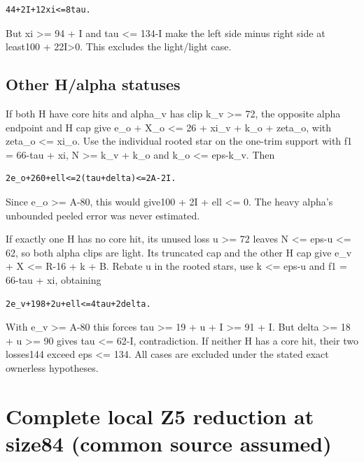 \documentclass[11pt,a4paper]{article}
\begin{document}
\begin{verbatim}
44+2I+12xi<=8tau.
\end{verbatim}

But xi \textgreater= 94 + I and tau \textless= 134-I make the left side
minus right side at least100 + 22I\textgreater0. This excludes the
light/light case.

\hypertarget{other-halpha-statuses}{%
\subsection{Other H/alpha statuses}\label{other-halpha-statuses}}

If both H have core hits and alpha\_v has clip k\_v \textgreater= 72,
the opposite alpha endpoint and H cap give e\_o + X\_o \textless= 26 +
xi\_v + k\_o + zeta\_o, with zeta\_o \textless= xi\_o. Use the
individual rooted star on the one-trim support with f1 = 66-tau + xi, N
\textgreater= k\_v + k\_o and k\_o \textless= eps-k\_v. Then

\begin{verbatim}
2e_o+260+ell<=2(tau+delta)<=2A-2I.
\end{verbatim}

Since e\_o \textgreater= A-80, this would give100 + 2I + ell \textless=
0. The heavy alpha's unbounded peeled error was never estimated.

If exactly one H has no core hit, its unused loss u \textgreater= 72
leaves N \textless= eps-u \textless= 62, so both alpha clips are light.
Its truncated cap and the other H cap give e\_v + X \textless= R-16 + k
+ B. Rebate u in the rooted stars, use k \textless= eps-u and f1 =
66-tau + xi, obtaining

\begin{verbatim}
2e_v+198+2u+ell<=4tau+2delta.
\end{verbatim}

With e\_v \textgreater= A-80 this forces tau \textgreater= 19 + u + I
\textgreater= 91 + I. But delta \textgreater= 18 + u \textgreater= 90
gives tau \textless= 62-I, contradiction. If neither H has a core hit,
their two losses144 exceed eps \textless= 134. All cases are excluded
under the stated exact ownerless hypotheses.

\clearpage
\hypertarget{complete-local-z5-reduction-at-size84-common-source-assumed}{%
\section{Complete local Z5 reduction at size84 (common source
assumed)}\label{complete-local-z5-reduction-at-size84-common-source-assumed}}
\end{document}
